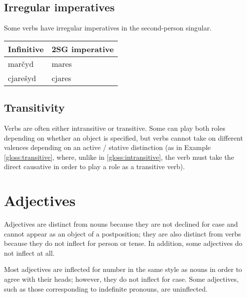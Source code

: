 \documentclass{book}
\begin{document}
\subsection{Irregular imperatives}

Some verbs have irregular imperatives in the second-person singular.

\begin{center}
	\begin{tabular}{|l|l|}
		\hline
		Infinitive & 2SG imperative \\ \hline
		marčyd & mares \\
		cjarešyd & cjares \\
		\hline
	\end{tabular}
\end{center}

\subsection{Transitivity}

Verbs are often either intransitive or transitive. Some can play both roles depending on whether an object is specified, but verbs cannot take on different valences depending on an active / stative distinction (as in Example \ref{gloss:transitive}, where, unlike in \ref{gloss:intransitive}, the verb must take the direct causative in order to play a role as a transitive verb).

\label{gloss:intransitive}
\label{gloss:transitive}

\section{Adjectives}

Adjectives are distinct from nouns because they are not declined for case and cannot appear as an object of a postposition; they are also distinct from verbs because they do not inflect for person or tense. In addition, some adjectives do not inflect at all.

Most adjectives are inflected for number in the same style as nouns in order to agree with their heads; however, they do not inflect for case. Some adjectives, such as those corresponding to indefinite pronouns, are uninflected.
\end{document}
